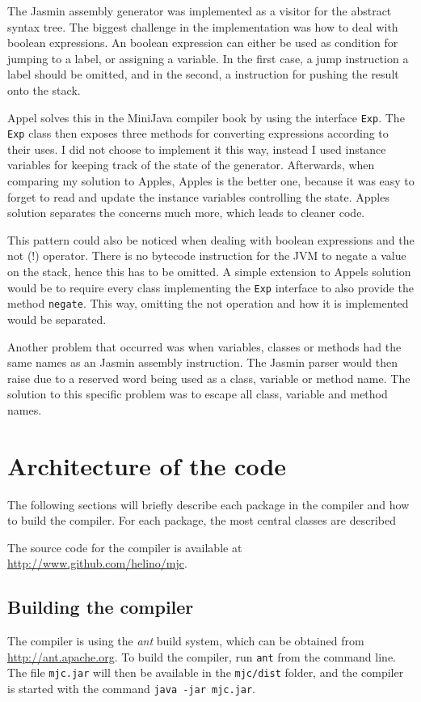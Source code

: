 \documentclass[11pt,oneside,a4paper]{article}
\begin{document}
The Jasmin assembly generator was implemented as a visitor for the abstract
syntax tree. The biggest challenge in the implementation was how to deal with
boolean expressions. An boolean expression can either be used as condition for
jumping to a label, or assigning a variable. In the first case, a jump
instruction a label should be omitted, and in the second, a instruction for
pushing the result onto the stack.

Appel solves this in the MiniJava compiler book by using the interface
\texttt{Exp}. The \texttt{Exp} class then exposes three methods for converting
expressions according to their uses. 
I did not choose to implement it this way, instead I used instance variables
for keeping track of the state of the generator. Afterwards, when comparing my
solution to Apples, Apples is the better one, because it was easy to forget to
read and update the instance variables controlling the state. Apples solution
separates the concerns much more, which leads to cleaner code.

This pattern could also be noticed when dealing with boolean expressions and
the not (!) operator. There is no bytecode instruction for the JVM to negate a
value on the stack, hence this has to be omitted. A simple extension to Appels
solution would be to require every class implementing the \texttt{Exp}
interface to also provide the method \texttt{negate}. This way, omitting the
not operation and how it is implemented would be separated.

Another problem that occurred was when variables, classes or methods had the
same names as an Jasmin assembly instruction. The Jasmin parser would then
raise due to a reserved word being used as a class, variable or method name. The
solution to this specific problem was to escape all class, variable and method
names.
\section{Architecture of the code}
The following sections will briefly describe each package in the compiler and
how to build the compiler. For each package, the most central classes are
described

The source code for the compiler is available at \\
\href{http://www.github.com/helino/mjc}{http://www.github.com/helino/mjc}.

\subsection{Building the compiler}
The compiler is using the \emph{ant} build system, which can be obtained from 
\href{http://ant.apache.org}{http://ant.apache.org}. To build the compiler, run
\texttt{ant} from the command line. 
The file \texttt{mjc.jar} will then be available in the
\texttt{mjc/dist} folder, and the compiler is started with the command 
\texttt{java -jar mjc.jar}.
\end{document}
